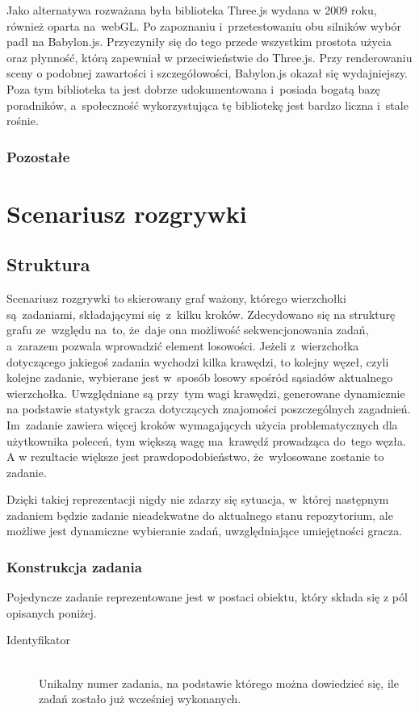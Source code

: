 \documentclass[12pt,a4paper,polish,thesis]{dcsbook}
\begin{document}
{	Jako alternatywa rozważana była biblioteka Three.js wydana w 2009 roku, również oparta na~webGL. Po zapoznaniu i~przetestowaniu obu silników wybór padł na Babylon.js. Przyczyniły się do tego przede wszystkim prostota użycia oraz płynność, którą zapewniał w przeciwieństwie do Three.js. Przy renderowaniu sceny o podobnej zawartości i szczegółowości, Babylon.js okazał się wydajniejszy. Poza tym biblioteka ta jest dobrze udokumentowana i~posiada bogatą bazę poradników, a~społeczność wykorzystująca tę bibliotekę jest bardzo liczna i~stale rośnie.

	\subsubsection{Pozostałe}

	\section{Scenariusz rozgrywki}

	\subsection{Struktura} \label{Struktura}

	Scenariusz rozgrywki to skierowany graf ważony, którego wierzchołki są~zadaniami, składającymi się~z~kilku kroków. Zdecydowano się na strukturę grafu ze~względu na~to, że~daje ona możliwość sekwencjonowania zadań, a~zarazem pozwala wprowadzić element losowości. Jeżeli z~wierzchołka dotyczącego jakiegoś zadania wychodzi kilka krawędzi, to kolejny węzeł, czyli kolejne zadanie, wybierane jest w~sposób losowy spośród sąsiadów aktualnego wierzchołka. Uwzględniane są przy~tym wagi krawędzi, generowane dynamicznie na podstawie statystyk gracza dotyczących znajomości poszczególnych zagadnień. Im~zadanie zawiera więcej kroków wymagających użycia problematycznych dla użytkownika poleceń, tym większą wagę ma~krawędź prowadząca do~tego węzła. A w rezultacie większe jest prawdopodobieństwo, że~wylosowane zostanie to zadanie.
	
	Dzięki takiej reprezentacji nigdy nie zdarzy się sytuacja, w~której następnym zadaniem będzie zadanie nieadekwatne do aktualnego stanu repozytorium, ale możliwe jest dynamiczne wybieranie zadań, uwzględniające umiejętności gracza.

	\subsubsection{Konstrukcja zadania}
	Pojedyncze zadanie reprezentowane jest w postaci obiektu, który składa się z pól opisanych poniżej.
	\begin{description}
	\item[Identyfikator] \hfill \\
		Unikalny numer zadania, na podstawie którego można dowiedzieć się, ile zadań zostało już wcześniej wykonanych.
		

\end{description}}
\end{document}
